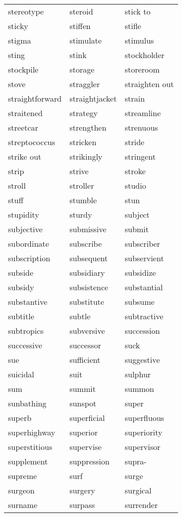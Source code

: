 \documentclass{minimal}
\begin{document}
\begin{longtable}{p{2.7cm}@{\hskip 0.2cm}p{2.7cm}@{\hskip 0.2cm}p{2.7cm}}
stereotype & steroid & stick to \\
sticky & stiffen & stifle \\
stigma & stimulate & stimulus \\
sting & stink & stockholder \\
stockpile & storage & storeroom \\
stove & straggler & straighten out \\
straightforward & straightjacket & strain \\
straitened & strategy & streamline \\
streetcar & strengthen & strenuous \\
streptococcus & stricken & stride \\
strike out & strikingly & stringent \\
strip & strive & stroke \\
stroll & stroller & studio \\
stuff & stumble & stun \\
stupidity & sturdy & subject \\
subjective & submissive & submit \\
subordinate & subscribe & subscriber \\
subscription & subsequent & subservient \\
subside & subsidiary & subsidize \\
subsidy & subsistence & substantial \\
substantive & substitute & subsume \\
subtitle & subtle & subtractive \\
subtropics & subversive & succession \\
successive & successor & suck \\
sue & sufficient & suggestive \\
suicidal & suit & sulphur \\
sum & summit & summon \\
sunbathing & sunspot & super \\
superb & superficial & superfluous \\
superhighway & superior & superiority \\
superstitious & supervise & supervisor \\
supplement & suppression & supra- \\
supreme & surf & surge \\
surgeon & surgery & surgical \\
surname & surpass & surrender \\

\end{longtable}
\end{document}
